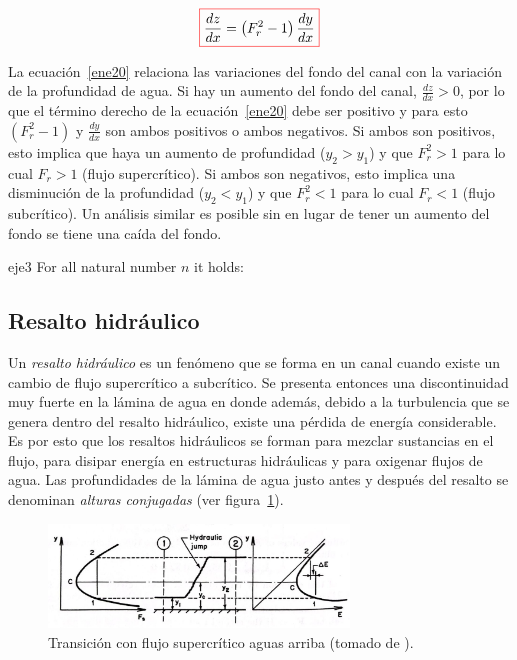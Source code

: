 \documentclass[11pt, oneside]{article}
\begin{document}
\begin{equation}
\color{red}\boxed{\color{black} \frac{dz}{dx} = \left( F_r^2 - 1 \right)\frac{dy}{dx} }
\label{ene20}
\end{equation}

La ecuaci\'on~\ref{ene20} relaciona las variaciones del fondo del canal con la variaci\'on de la profundidad de agua. Si hay un aumento del fondo del canal, $\frac{dz}{dx} > 0$, por lo que el t\'ermino derecho de la ecuaci\'on~\ref{ene20} debe ser positivo y para esto $\left( F_r^2 - 1 \right)$ y  $\frac{dy}{dx}$ son ambos positivos o ambos negativos. Si ambos son positivos, esto implica que haya un aumento de profundidad ($y_2 > y_1$) y que $F_r^2 > 1$ para lo cual $F_r > 1$ (flujo supercr\'itico). Si ambos son negativos, esto implica una disminuci\'on de la profundidad ($y_2 < y_1$) y que $F_r^2 < 1$ para lo cual $F_r < 1$ (flujo subcr\'itico). Un an\'alisis similar es posible sin en lugar de tener un aumento del fondo se tiene una ca\'ida del fondo. 
 
\begin{eje}{}{eje3}
  For all natural number $n$ it holds:
\end{eje}


\subsection{Resalto hidr\'aulico}
Un \emph{resalto hidr\'aulico} es un fen\'omeno que se forma en un canal cuando existe un cambio de flujo supercr\'itico a subcr\'itico. Se presenta entonces una discontinuidad muy fuerte en la l\'amina de agua en donde adem\'as, debido a la turbulencia que se genera dentro del resalto hidr\'aulico, existe una p\'erdida de energ\'ia considerable. Es por esto que los resaltos hidr\'aulicos se forman para mezclar sustancias en el flujo, para disipar energ\'ia en estructuras hidr\'aulicas y para oxigenar flujos de agua. Las profundidades de la l\'amina de agua justo antes y despu\'es del resalto se denominan \emph{alturas conjugadas} (ver figura~\ref{fig14}). 

\begin{figure}[h]
\centering
\includegraphics[width=8cm]{fig211.jpeg}
\caption{Transici\'on con flujo supercr\'itico aguas arriba (tomado de \cite{Chau}).}
\label{fig14}
\end{figure}
\end{document}
